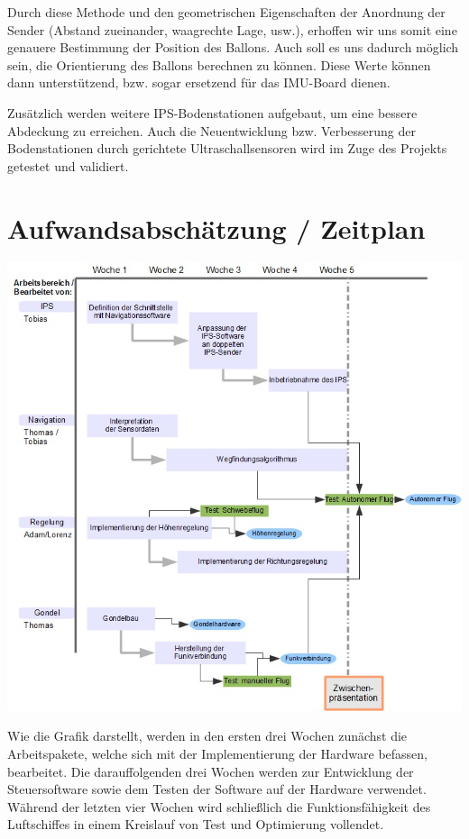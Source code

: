 \documentclass[lang=ngerman,inputenc=utf8,fontsize=10pt]{ldvarticle}
\begin{document}
Durch diese Methode und den geometrischen Eigenschaften der Anordnung der Sender (Abstand zueinander, waagrechte Lage, usw.), erhoffen wir uns somit eine genauere Bestimmung der Position des Ballons. Auch soll es uns dadurch möglich sein, die Orientierung des Ballons berechnen zu können. Diese Werte können dann unterstützend, bzw. sogar ersetzend für das IMU-Board dienen.


Zusätzlich werden weitere IPS-Bodenstationen aufgebaut, um eine bessere Abdeckung zu erreichen. Auch die Neuentwicklung bzw. Verbesserung der Bodenstationen durch gerichtete Ultraschallsensoren wird im Zuge des Projekts getestet und validiert.


\section{Aufwandsabschätzung / Zeitplan}

\includegraphics[scale=0.5]{Zeitplan-Arbeitspakete}

Wie die Grafik darstellt, werden in den ersten drei Wochen zunächst die Arbeitspakete, welche sich mit der Implementierung der Hardware befassen, bearbeitet. Die darauffolgenden drei Wochen werden zur Entwicklung der Steuersoftware sowie dem Testen der Software auf der Hardware verwendet. Während der letzten vier Wochen wird schließlich die Funktionsfähigkeit des Luftschiffes in einem Kreislauf von Test und Optimierung vollendet.
\end{document}
